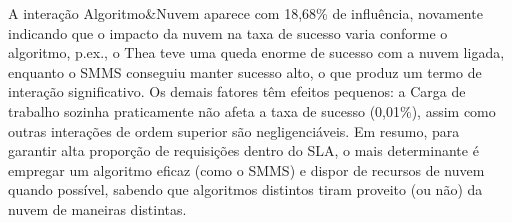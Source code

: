 A interação Algoritmo\&Nuvem aparece com 18,68\% de influência, novamente indicando que o impacto da nuvem na taxa de sucesso varia conforme o algoritmo, p.ex., o Thea teve uma queda enorme de sucesso com a nuvem ligada, enquanto o SMMS conseguiu manter sucesso alto, o que produz um termo de interação significativo. Os demais fatores têm efeitos pequenos: a Carga de trabalho sozinha praticamente não afeta a taxa de sucesso (0,01\%), assim como outras interações de ordem superior são negligenciáveis. Em resumo, para garantir alta proporção de requisições dentro do SLA, o mais determinante é empregar um algoritmo eficaz (como o SMMS) e dispor de recursos de nuvem quando possível, sabendo que algoritmos distintos tiram proveito (ou não) da nuvem de maneiras distintas.





